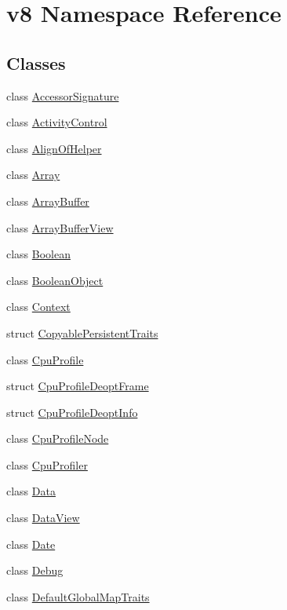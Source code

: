 \hypertarget{namespacev8}{}\section{v8 Namespace Reference}
\label{namespacev8}
\subsection*{Classes}
\begin{DoxyCompactItemize}
\item 
class \hyperlink{classv8_1_1_accessor_signature}{Accessor\+Signature}
\item 
class \hyperlink{classv8_1_1_activity_control}{Activity\+Control}
\item 
class \hyperlink{classv8_1_1_align_of_helper}{Align\+Of\+Helper}
\item 
class \hyperlink{classv8_1_1_array}{Array}
\item 
class \hyperlink{classv8_1_1_array_buffer}{Array\+Buffer}
\item 
class \hyperlink{classv8_1_1_array_buffer_view}{Array\+Buffer\+View}
\item 
class \hyperlink{classv8_1_1_boolean}{Boolean}
\item 
class \hyperlink{classv8_1_1_boolean_object}{Boolean\+Object}
\item 
class \hyperlink{classv8_1_1_context}{Context}
\item 
struct \hyperlink{structv8_1_1_copyable_persistent_traits}{Copyable\+Persistent\+Traits}
\item 
class \hyperlink{classv8_1_1_cpu_profile}{Cpu\+Profile}
\item 
struct \hyperlink{structv8_1_1_cpu_profile_deopt_frame}{Cpu\+Profile\+Deopt\+Frame}
\item 
struct \hyperlink{structv8_1_1_cpu_profile_deopt_info}{Cpu\+Profile\+Deopt\+Info}
\item 
class \hyperlink{classv8_1_1_cpu_profile_node}{Cpu\+Profile\+Node}
\item 
class \hyperlink{classv8_1_1_cpu_profiler}{Cpu\+Profiler}
\item 
class \hyperlink{classv8_1_1_data}{Data}
\item 
class \hyperlink{classv8_1_1_data_view}{Data\+View}
\item 
class \hyperlink{classv8_1_1_date}{Date}
\item 
class \hyperlink{classv8_1_1_debug}{Debug}
\item 
class \hyperlink{classv8_1_1_default_global_map_traits}{Default\+Global\+Map\+Traits}

\end{DoxyCompactItemize}
